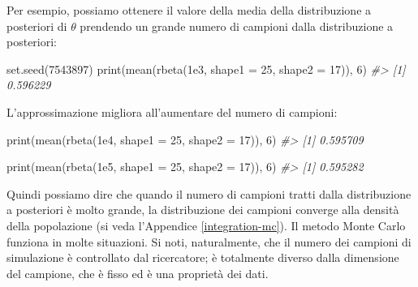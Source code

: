 \documentclass[
]{memoir}
\newenvironment{Shaded}{\begin{snugshade}}{\end{snugshade}}
\newcommand{\AttributeTok}[1]{\textcolor[rgb]{0.77,0.63,0.00}{#1}}
\newcommand{\CommentTok}[1]{\textcolor[rgb]{0.56,0.35,0.01}{\textit{#1}}}
\newcommand{\DecValTok}[1]{\textcolor[rgb]{0.00,0.00,0.81}{#1}}
\newcommand{\FloatTok}[1]{\textcolor[rgb]{0.00,0.00,0.81}{#1}}
\newcommand{\FunctionTok}[1]{\textcolor[rgb]{0.00,0.00,0.00}{#1}}
\newcommand{\NormalTok}[1]{#1}
\begin{document}
Per esempio, possiamo ottenere il valore della media della distribuzione a posteriori di \(\theta\) prendendo un grande numero di campioni dalla distribuzione a posteriori:

\begin{Shaded}
\begin{Highlighting}[]
\FunctionTok{set.seed}\NormalTok{(}\DecValTok{7543897}\NormalTok{)}
\FunctionTok{print}\NormalTok{(}\FunctionTok{mean}\NormalTok{(}\FunctionTok{rbeta}\NormalTok{(}\FloatTok{1e3}\NormalTok{, }\AttributeTok{shape1 =} \DecValTok{25}\NormalTok{, }\AttributeTok{shape2 =} \DecValTok{17}\NormalTok{)), }\DecValTok{6}\NormalTok{)}
\CommentTok{\#\textgreater{} [1] 0.596229}
\end{Highlighting}
\end{Shaded}

L'approssimazione migliora all'aumentare del numero di campioni:

\begin{Shaded}
\begin{Highlighting}[]
\FunctionTok{print}\NormalTok{(}\FunctionTok{mean}\NormalTok{(}\FunctionTok{rbeta}\NormalTok{(}\FloatTok{1e4}\NormalTok{, }\AttributeTok{shape1 =} \DecValTok{25}\NormalTok{, }\AttributeTok{shape2 =} \DecValTok{17}\NormalTok{)), }\DecValTok{6}\NormalTok{)}
\CommentTok{\#\textgreater{} [1] 0.595709}
\end{Highlighting}
\end{Shaded}

\begin{Shaded}
\begin{Highlighting}[]
\FunctionTok{print}\NormalTok{(}\FunctionTok{mean}\NormalTok{(}\FunctionTok{rbeta}\NormalTok{(}\FloatTok{1e5}\NormalTok{, }\AttributeTok{shape1 =} \DecValTok{25}\NormalTok{, }\AttributeTok{shape2 =} \DecValTok{17}\NormalTok{)), }\DecValTok{6}\NormalTok{)}
\CommentTok{\#\textgreater{} [1] 0.595282}
\end{Highlighting}
\end{Shaded}

Quindi possiamo dire che quando il numero di campioni tratti dalla distribuzione a posteriori è molto grande, la distribuzione dei campioni converge alla densità della popolazione (si veda l'Appendice \ref{integration-mc}). Il metodo Monte Carlo funziona in molte situazioni. Si noti, naturalmente, che il numero dei campioni di simulazione è controllato dal ricercatore; è totalmente diverso dalla dimensione del campione, che è fisso ed è una proprietà dei dati.
\end{document}
